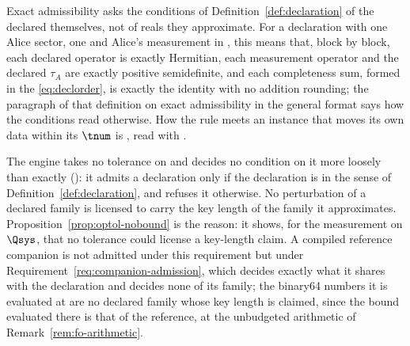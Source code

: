 
Exact admissibility asks the conditions of
Definition~\ref{def:declaration} of the declared
 themselves, not of reals they approximate. For a
declaration with one Alice sector, one  and Alice's
measurement in , this means that, block by block, each
declared operator is exactly Hermitian, each measurement operator and the
declared $\tau_A$ are exactly positive semidefinite, and each completeness
sum, formed in the  \eqref{eq:declorder}, is exactly
the identity with no addition rounding; the paragraph of that definition on
exact admissibility in the general format says how the conditions read
otherwise. How the rule meets an instance that moves its own data within
its  $\tnum$ is
, read with
.

\begin{requirement}\label{req:exact-admission}
The engine takes no tolerance on  and decides no
condition on it more loosely than exactly
(): it admits a declaration
only if the declaration is  in the sense of
Definition~\ref{def:declaration}, and refuses it otherwise. No
perturbation of a declared family is licensed to carry the key length of
the family it approximates. Proposition~\ref{prop:optol-nobound} is the
reason: it shows, for the measurement on $\Qsys$, that no tolerance could
license a key-length claim. A compiled reference companion is not admitted
under this requirement but under Requirement~\ref{req:companion-admission},
which decides exactly what it shares with the declaration and decides none
of its family; the binary64 numbers it is evaluated at are no declared
family whose key length is claimed, since the bound evaluated there is that
of the reference, at the unbudgeted arithmetic of
Remark~\ref{rem:fo-arithmetic}.
\end{requirement}

